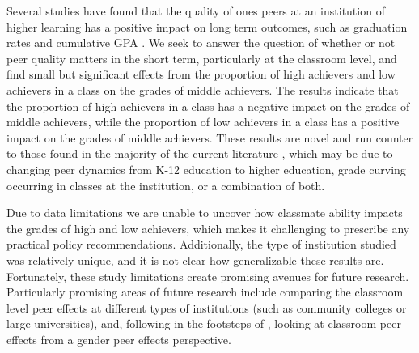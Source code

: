\documentclass[12pt,letterpaper,english,fleqn]{article}
\begin{document}

Several studies have found that the quality of ones peers at an institution of higher learning has a positive impact on long term outcomes, such as graduation rates and cumulative GPA \citep{smith2015new,luppino2015college,ost2010role}.
We seek to answer the question of whether or not peer quality matters in the short term, particularly at the classroom level, and find small but significant effects from the proportion of high achievers and low achievers in a class on the grades of middle achievers. 
The results indicate that the proportion of high achievers in a class has a negative impact on the grades of middle achievers, while the proportion of low achievers in a class has a positive impact on the grades of middle achievers. 
These results are novel and run counter to those found in the majority of the current literature \citep{kang2007classroom,carman2012classroom,burke2013classroom,schlosser2008inside,lavy2012good}, which may be due to changing peer dynamics from K-12 education to higher education, grade curving occurring in classes at the institution, or a combination of both.
 
Due to data limitations we are unable to uncover how classmate ability impacts the grades of high and low achievers, which makes it challenging to prescribe any practical policy recommendations.
Additionally, the type of institution studied was relatively unique, and it is not clear how generalizable these results are. 
Fortunately, these study limitations create promising avenues for future research.
Particularly promising areas of future research include comparing the classroom level peer effects at different types of institutions (such as community colleges or large universities), and, following in the footsteps of \citet{oosterbeek2014gender}, looking at classroom peer effects from a gender peer effects perspective.
       
\newpage{}

\pagestyle{plain}
\singlespacing
{}


\clearpage{}

\pagestyle{fancy}
\begin{appendices}



\end{appendices}
\end{document}

